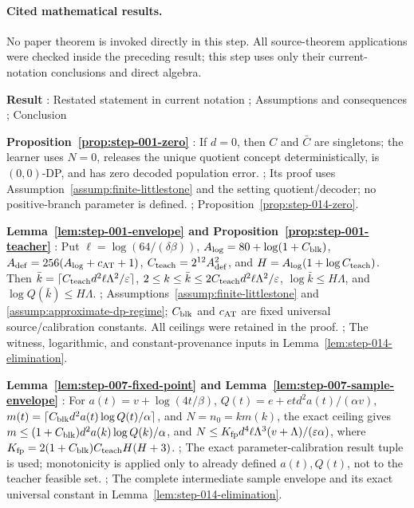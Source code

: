 \paragraph{Cited mathematical results.}


No paper theorem is invoked directly in this step. All source-theorem
applications were checked inside the preceding result; this step uses
only their  current-notation conclusions and direct algebra.

\noindent\textbf{ Result }:  Restated statement in current notation ;  Assumptions and consequences ;  Conclusion \par
\noindent\textbf{ Proposition~\ref{prop:step-001-zero} }:  If \(d=0\), then \(C\) and \(\bar C\) are singletons; the learner uses \(N=0\), releases the unique quotient concept deterministically, is \((0,0)\)-DP, and has zero decoded population error. ;  Its  proof uses Assumption~\ref{assump:finite-littlestone} and the setting quotient/decoder; no positive-branch parameter is defined. ;  Proposition~\ref{prop:step-014-zero}. \par
\noindent\textbf{ Lemma~\ref{lem:step-001-envelope} and Proposition~\ref{prop:step-001-teacher} }:  Put \(\ell=\log(64/(\delta\beta))\), \(A_{\log}=80+\log(1+C_{\rm blk})\), \(A_{\rm def}=256(A_{\log}+c_{\rm AT}+1)\), \(C_{\rm teach}=2^{12}A_{\rm def}^2\), and \(H=A_{\log}(1+\log C_{\rm teach})\). Then \(\bar k=\lceil C_{\rm teach}d^2\ell\Lambda^2/\varepsilon\rceil\), \(2\leq k\leq\bar k\leq2C_{\rm teach}d^2\ell\Lambda^2/\varepsilon\), \(\log\bar k\leq H\Lambda\), and \(\log Q(\bar k)\leq H\Lambda\). ;  Assumptions~\ref{assump:finite-littlestone} and \ref{assump:approximate-dp-regime}; \(C_{\rm blk}\) and \(c_{\rm AT}\) are fixed universal source/calibration constants. All ceilings were retained in the  proof. ;  The witness, logarithmic, and constant-provenance inputs in Lemma~\ref{lem:step-014-elimination}. \par
\noindent\textbf{ Lemma~\ref{lem:step-007-fixed-point} and Lemma~\ref{lem:step-007-sample-envelope} }:  For \(a(t)=v+\log(4t/\beta)\), \(Q(t)=e+etd^2a(t)/(\alpha v)\), \(m(t)=\lceil C_{\rm blk}d^2a(t)\log Q(t)/\alpha\rceil\), and \(N=n_0=km(k)\), the exact ceiling gives \(m\leq(1+C_{\rm blk})d^2a(k)\log Q(k)/\alpha\), and \(N\leq K_{\rm fp}d^4\ell\Lambda^3(v+\Lambda)/(\varepsilon\alpha)\), where \(K_{\rm fp}=2(1+C_{\rm blk})C_{\rm teach}H(H+3)\). ;  The exact parameter-calibration result tuple is used; monotonicity is applied only to already defined \(a(t),Q(t)\), not to the teacher feasible set. ;  The complete intermediate sample envelope and its exact universal constant in Lemma~\ref{lem:step-014-elimination}. \par
